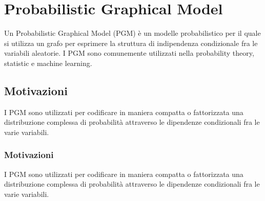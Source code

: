 \setchapterpreamble[u]{\margintoc}
\chapter{Probabilistic Graphical Model}
Un Probabilistic Graphical Model (PGM) è un modelle probabilistico per il quale si utilizza un grafo per esprimere la struttura di indipendenza condizionale fra le variabili aleatorie. I PGM sono comunemente utilizzati nella probability theory, statistic e machine learning.


\section{Motivazioni}
I PGM sono utilizzati per codificare in maniera compatta o fattorizzata una distribuzione complessa di probabilità attraverso le dipendenze condizionali fra le varie variabili. 

\subsection{Motivazioni}
I PGM sono utilizzati per codificare in maniera compatta o fattorizzata una distribuzione complessa di probabilità attraverso le dipendenze condizionali fra le varie variabili. 








